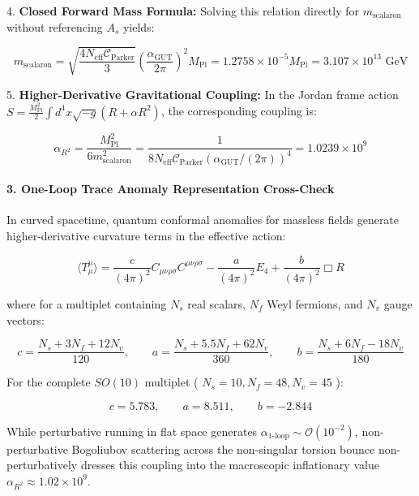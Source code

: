 \documentclass[11pt,a4paper]{article}
\theoremstyle{definition}\newtheorem{definition}{Definition}
\theoremstyle{remark}\newtheorem{remark}{Remark}
\begin{document}
4. \textbf{Closed Forward Mass Formula:} Solving this relation directly for $m_{\text{scalaron}}$ without referencing $A_s$ yields:


\begin{equation}
\boxed{m_{\text{scalaron}} = \sqrt{\frac{4 N_{\text{eff}} \mathcal{C}_{\text{Parker}}}{3}} \left(\frac{\alpha_{\text{GUT}}}{2\pi}\right)^2 M_{\text{Pl}} = 1.2758 \times 10^{-5} M_{\text{Pl}} = 3.107 \times 10^{13}\text{ GeV}}
\end{equation}


5. \textbf{Higher-Derivative Gravitational Coupling:} In the Jordan frame action $S = \frac{M_{\text{Pl}}^2}{2} \int d^4 x \sqrt{-g} (R + \alpha R^2)$, the corresponding coupling is:


\begin{equation}
\boxed{\alpha_{R^2} = \frac{M_{\text{Pl}}^2}{6 m_{\text{scalaron}}^2} = \frac{1}{8 N_{\text{eff}} \mathcal{C}_{\text{Parker}} (\alpha_{\text{GUT}} / (2\pi))^4} = 1.0239 \times 10^9}
\end{equation}

\paragraph{3. One-Loop Trace Anomaly Representation Cross-Check}

In curved spacetime, quantum conformal anomalies for massless fields generate higher-derivative curvature terms in the effective action:


\begin{equation}
\langle T^\mu_\mu \rangle = \frac{c}{(4\pi)^2} C_{\mu\nu\rho\sigma} C^{\mu\nu\rho\sigma} - \frac{a}{(4\pi)^2} E_4 + \frac{b}{(4\pi)^2} \Box R
\end{equation}


where for a multiplet containing $N_s$ real scalars, $N_f$ Weyl fermions, and $N_v$ gauge vectors:


\begin{equation}
c = \frac{N_s + 3 N_f + 12 N_v}{120}, \qquad a = \frac{N_s + 5.5 N_f + 62 N_v}{360}, \qquad b = \frac{N_s + 6 N_f - 18 N_v}{180}
\end{equation}


For the complete $SO(10)$ multiplet ( $N_s = 10, N_f = 48, N_v = 45$ ):


\begin{equation}
c = 5.783, \qquad a = 8.511, \qquad b = -2.844
\end{equation}


While perturbative running in flat space generates $\alpha_{\text{1-loop}} \sim \mathcal{O}(10^{-2})$, non-perturbative Bogoliubov scattering across the non-singular torsion bounce non-perturbatively dresses this coupling into the macroscopic inflationary value $\alpha_{R^2} \approx 1.02 \times 10^9$.
\end{document}
